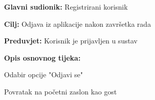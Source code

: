 				
				
				\noindent {}
				\begin{packed_item}
					
					\item \textbf{Glavni sudionik: }Registrirani korisnik
					\item  \textbf{Cilj:} Odjava iz aplikacije nakon završetka rada
					\item  \textbf{Preduvjet:} Korisnik je prijavljen u sustav
					\item  \textbf{Opis osnovnog tijeka:}
					
					\item[] \begin{packed_enum}
						
						\item Odabir opcije "Odjavi se"
						\item Povratak na početni zaslon kao gost
					
					\end{packed_enum}
					
				\end{packed_item}
				
				
				
